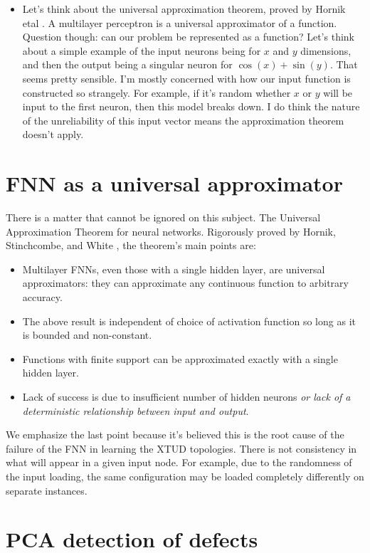 \begin{itemize}
	\item Let's think about the universal approximation theorem, proved by Hornik etal \cite{hornik1989multilayer}. A multilayer perceptron is a universal approximator of a function. Question though: can our problem be represented as a function? Let's think about a simple example of the input neurons being for $x$ and $y$ dimensions, and then the output being a singular neuron for $\cos(x)+\sin(y)$. That seems pretty sensible. I'm mostly concerned with how our input function is constructed so strangely. For example, if it's random whether $x$ or $y$ will be input to the first neuron, then this model breaks down.
	I do think the nature of the unreliability of this input vector means the approximation theorem doesn't apply. 
\end{itemize}

\section{FNN as a universal approximator}
There is a matter that cannot be ignored on this subject. The Universal Approximation Theorem for neural networks. Rigorously proved by Hornik, Stinchcombe, and White \cite{hornik1989multilayer}, the theorem's main points are:
\begin{itemize}
	\item Multilayer FNNs, even those with a single hidden layer, are universal approximators: they can approximate any continuous function to arbitrary accuracy.
	\item The above result is independent of choice of activation function so long as it is bounded and non-constant.
	\item Functions with finite support can be approximated exactly with a single hidden layer.
	\item Lack of success is due to insufficient number of hidden neurons \emph{or lack of a deterministic relationship between input and output}.
\end{itemize}
We emphasize the last point because it's believed this is the root cause of the failure of the FNN in learning the XTUD topologies. There is not consistency in what will appear in a given input node. For example, due to the randomness of the input loading, the same configuration may be loaded completely differently on separate instances.


\section{PCA detection of defects}
